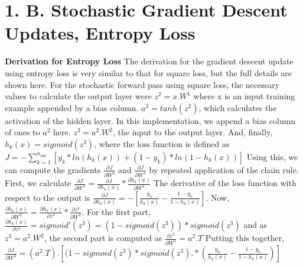 \documentclass[11pt]{article}
\begin{document}
\section*{1. B. Stochastic Gradient Descent Updates, Entropy Loss}
\textbf{Derivation for Entropy Loss}
\newline
The derivation for the gradient descent update using entropy loss is very similar to that for square loss, but the full details are shown here. 
\newline
For the stochastic forward pass using square loss, the necessary values to calculate the output layer were
\newline
$ z^{2} = x.W^{1} $ where x is an input training example appended by a bias column.
\newline
$ a^{2} =  tanh(z^{2}) $, which calculates the activation of the hidden layer. In this implementation, we append a bias column of ones to $a^{2}$ here.
\newline
$ z^{3} = a^{2}.W^{2}$, the input to the output layer.
\newline
And, finally, $h_{k}(x) = sigmoid(z^{3}) $, where the loss function is defined as $ J = - \sum_{k=1}^{n_{out}} [y_{k}*ln(h_{k}(x)) + (1 - y_{k})* ln(1 - h_{k}(x))]$
\newline
Using this, we can compute the gradients $\frac{\partial J}{\partial W^{2}}$ and $\frac{\partial J}{\partial W^{1}}$ by repeated application of the chain rule.
\newline
First, we calculate $\frac{\partial J}{\partial W^{2}} = \frac{\partial J}{\partial h_{k}(x)} * \frac{\partial h_{k}(x)}{\partial W^{2}}$
\newline
The derivative of the loss function with respect to the output is $\frac{\partial J}{\partial h_{k}(x)} = - [\frac{y_{k}}{h_{k}(x)} - \frac{1 - y_{k}}{1-h_{k}(x)}]$.
\newline
Now, $\frac{\partial h_{k}(x)}{\partial W^{2}} = \frac{\partial h_{k}(x)}{\partial z^{3}} * \frac{\partial z^{3}}{\partial W^{2}}$.
\newline
For the first part, $\frac{\partial h_{k}(x)}{\partial z^{3}} = sigmoid'(z^{3}) = (1 - sigmoid(z^{3}))*sigmoid(z^{3})$ and as $ z^{3} = a^{2}.W^{2}$, the second part is computed as $\frac{\partial z^{3}}{\partial W^{2}} = a^{2}.T$
\newline
Putting this together, $\frac{\partial J}{\partial W^{2}} = (a^{2}.T) . [(1 - sigmoid(z^{3})*sigmoid(z^{3}) .* (\frac{y_{k}}{h_{k}(x)} - \frac{1 - y_{k}}{1-h_{k}(x)})]$
\newline
\end{document}

